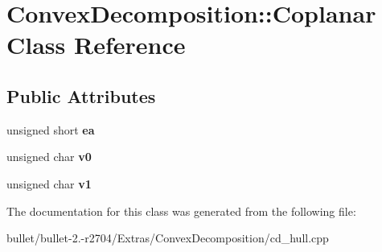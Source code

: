 \hypertarget{class_convex_decomposition_1_1_coplanar}{\section{Convex\+Decomposition\+:\+:Coplanar Class Reference}
\label{class_convex_decomposition_1_1_coplanar}
}
\subsection*{Public Attributes}
\begin{DoxyCompactItemize}
\item 
\hypertarget{class_convex_decomposition_1_1_coplanar_ae42dbf4af9303d285620e4ec096d451c}{unsigned short {\bfseries ea}}\label{class_convex_decomposition_1_1_coplanar_ae42dbf4af9303d285620e4ec096d451c}

\item 
\hypertarget{class_convex_decomposition_1_1_coplanar_a370ca95b63f2180408ac5b77481e69bb}{unsigned char {\bfseries v0}}\label{class_convex_decomposition_1_1_coplanar_a370ca95b63f2180408ac5b77481e69bb}

\item 
\hypertarget{class_convex_decomposition_1_1_coplanar_ade0b99c0728422ce2cddcb83d7269c53}{unsigned char {\bfseries v1}}\label{class_convex_decomposition_1_1_coplanar_ade0b99c0728422ce2cddcb83d7269c53}

\end{DoxyCompactItemize}


The documentation for this class was generated from the following file\+:\begin{DoxyCompactItemize}
\item 
bullet/bullet-\/2.-\/r2704/\+Extras/\+Convex\+Decomposition/cd\+\_\+hull.\+cpp\end{DoxyCompactItemize}
